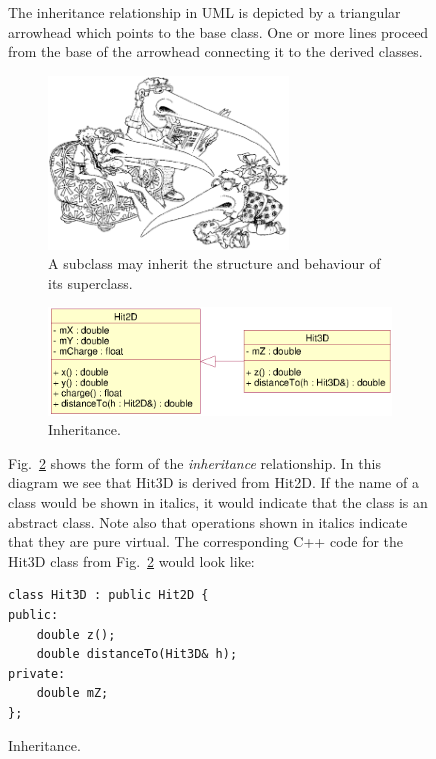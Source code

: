 \documentclass[twoside]{article}
\begin{document}
\begin{figure}[htb]
\begin{center}
The inheritance relationship in UML is depicted by a triangular
arrowhead which points to the base class. One or more lines proceed
from the base of the arrowhead connecting it to the derived classes.
\begin{figure}[htb]
    \begin{center}
        \includegraphics[width=0.7\textwidth]{cartoon6.eps}
        \caption{A subclass may inherit the structure and behaviour
            of its superclass.}
    \end{center}
\end{figure}
\begin{figure}[htb]
    \begin{center}
        \includegraphics{umlInheritance.eps}
        \caption{Inheritance.}
        \label{fig:umlInheritance}
    \end{center}
\end{figure}

Fig.~\ref{fig:umlInheritance} shows the form of the \emph{inheritance}
relationship.  In this diagram we see that Hit3D is derived from
Hit2D.  If the name of a class would be shown in italics, it would
indicate that the class is an abstract class.  Note also that
operations shown in italics indicate that they are pure virtual.  The
corresponding C++ code for the Hit3D class from
Fig.~\ref{fig:umlInheritance} would look like:

{\footnotesize
\begin{verbatim}
class Hit3D : public Hit2D {
public:
    double z();
    double distanceTo(Hit3D& h);
private:
    double mZ;
};
\end{verbatim}
}%


\end{center}
\end{figure}
\end{document}
